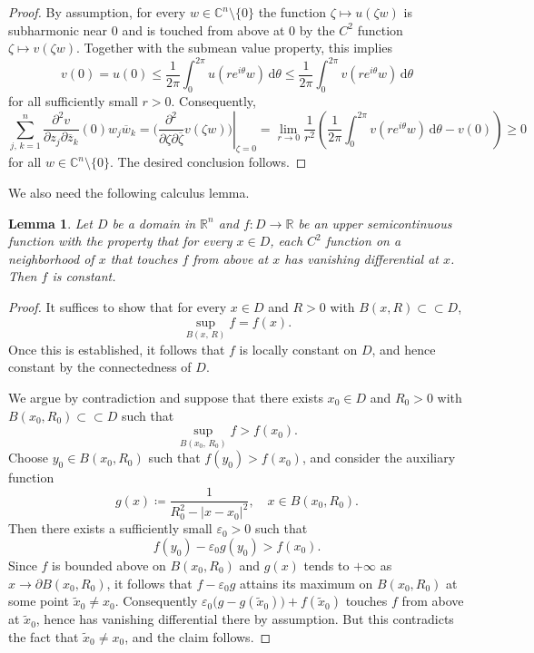 \documentclass[12pt,a4paper]{amsart}
\numberwithin{equation}{section}
\newtheorem{lemma}[theorem]{Lemma}
\theoremstyle{definition}
\newcommand{\dd}{\mathrm d}
\begin{document}
\begin{proof}
By assumption, for every $w\in\mathbb{C}^n \!\setminus\! \{0\}$ the function $\zeta\mapsto u(\zeta w)$ is subharmonic near $0$ and is touched from above
at $0$ by the $C^2$ function $\zeta\mapsto v(\zeta w)$. Together with the submean value property, this implies
\[
 v(0)=u(0) \le \frac{1}{2\pi}\int_0^{2\pi}u(re^{i\theta}w)\,\dd\theta
 \le \frac{1}{2\pi}\int_0^{2\pi}v(re^{i\theta}w)\,\dd\theta
\]
for all sufficiently small $r>0$. Consequently,
\[
\sum_{j,\, k=1}^{n} \frac{\partial^2 v}{\partial z_j\partial\overline{z}_k}(0) w_j\overline{w}_k
=\left.\bigg(\frac{\partial^2}{\partial\zeta\partial\overline{\zeta}} v(\zeta w)\bigg)\right|_{\zeta=0}
=\lim_{r\to 0}\frac{1}{r^2}\left(\frac{1}{2\pi}\int_0^{2\pi}v(re^{i\theta}w)\,\dd\theta-v(0)\right)
\ge 0
\]
for all $w\in\mathbb{C}^n \!\setminus\!\{0\}$. The desired conclusion follows.
\end{proof}


We also need the following calculus lemma.


\begin{lemma}\label{lem:calculus}
Let $D$ be a domain in $\mathbb{R}^n$ and $f\!:D\to\mathbb{R}$ be an upper semicontinuous function with the property that for every $x\in D$, each $C^2$ function on a neighborhood of $x$ that touches $f$ from above at $x$ has vanishing differential at $x$. Then $f$ is constant.
\end{lemma}




\begin{proof}
It suffices to show that for every $x\in D$ and $R>0$ with $B(x, R)\subset\subset D$,
\[
\sup_{B(x,\, R)} f=f(x).
\]
Once this is established, it follows that $f$ is locally constant on $D$, and hence constant by the connectedness of $D$.

We argue by contradiction and suppose that there exists $x_0\in D$ and $R_0>0$ with $B(x_0, R_0)\subset\subset D$ such that
\[
\sup_{B(x_0,\, R_0)} f>f(x_0).
\]
Choose $y_0\in B(x_0, R_0)$ such that $f(y_0)>f(x_0)$, and consider the auxiliary function
\[
g(x)\coloneqq \frac{1}{R_0^2-|x-x_0|^2}, \quad x\in B(x_0,  R_0).
\]
Then there exists a sufficiently small $\varepsilon_0>0$ such that
$$f(y_0)-\varepsilon_0 g(y_0)>f(x_0).$$ Since $f$ is bounded above on $B(x_0,R_0)$ and $g(x)$ tends to $+\infty$ as
$x\to\partial B(x_0,R_0)$, it follows that $f-\varepsilon_0 g$ attains its maximum on $B(x_0, R_0)$ at some point $\widetilde{x}_0\ne x_0$. Consequently
$\varepsilon_0\bigl(g-g(\widetilde{x}_0)\bigr)+f(\widetilde{x}_0)$ touches $f$ from above at $\widetilde{x}_0$, hence has vanishing
differential there by assumption. But this contradicts the
fact that $\widetilde{x}_0\ne x_0$, and the claim follows.
\end{proof}
\end{document}
